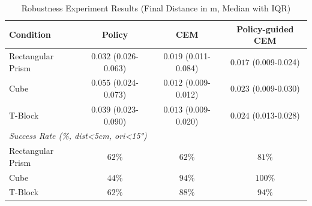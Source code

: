 \begin{table}[htbp]
\centering
\caption{Robustness Experiment Results (Final Distance in m, Median with IQR)}
\label{tab:robustness_results}
\begin{tabular}{lccc}
\toprule
Condition & Policy & CEM & Policy-guided CEM \\
\midrule
Rectangular Prism & $0.032$ (0.026-0.063) & $0.019$ (0.011-0.084) & $0.017$ (0.009-0.024) \\
Cube & $0.055$ (0.024-0.073) & $0.012$ (0.009-0.012) & $0.023$ (0.009-0.030) \\
T-Block & $0.039$ (0.023-0.090) & $0.013$ (0.009-0.020) & $0.024$ (0.013-0.028) \\
\midrule
\multicolumn{4}{l}{\textit{Success Rate (\%, dist<5cm, ori<15°)}} \\
Rectangular Prism & $62\%$ & $62\%$ & $81\%$ \\
Cube & $44\%$ & $94\%$ & $100\%$ \\
T-Block & $62\%$ & $88\%$ & $94\%$ \\
\bottomrule
\end{tabular}
\end{table}